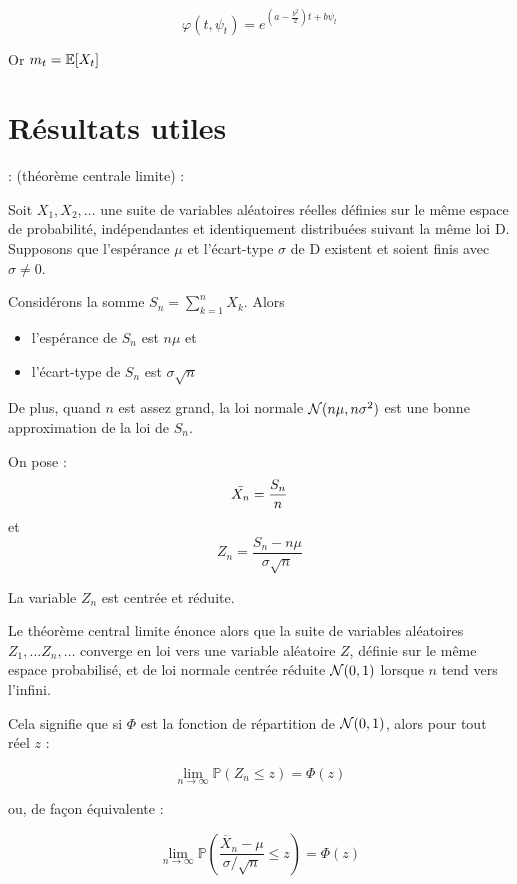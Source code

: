 \[ \varphi(t,\psi_t) = e^{(a-\frac{b^2}{2})t + b\psi_t} \]


Or $m_t = \mathbb{E}[X_t]$
\chapter{Résultats utiles}

\Th : (théorème centrale limite) : 

Soit $X_1, X_2,\ldots$ une suite de variables aléatoires réelles définies sur le même espace de probabilité, indépendantes et identiquement distribuées suivant la même loi D. Supposons que l'espérance $\mu$ et l'écart-type $\sigma$ de D existent et soient finis avec $\sigma \neq 0$.

Considérons la somme $S_n = \sum_{k=1}^n X_k$. Alors 
\begin{itemize}
  \item l'espérance de $S_n$ est $n\mu$ et
  \item l'écart-type de $S_n$ est $\sigma\sqrt{n}$
\end{itemize}

De plus, quand $n$  est \og assez grand\fg{}, la loi normale $\mathcal{N}(n\mu, n\sigma^2)$ est une bonne approximation de la loi de $S_n$.

On pose : 
\[ \Bar{X_n} = \frac{S_n}{n} \]
et 
\[ Z_n = \frac{S_n - n\mu}{\sigma\sqrt{n}} \]

La variable $Z_n$ est centrée et réduite.

Le théorème central limite énonce alors que la suite de variables aléatoires $Z_1, \ldots Z_n, \ldots$ converge en loi vers une variable aléatoire $Z$, définie sur le même espace probabilisé, et de loi normale centrée réduite $\mathcal{N}(0,1)$ lorsque $n$ tend vers l'infini.

Cela signifie que si $\Phi$ est la fonction de répartition de $\mathcal{N}(0,1)$, alors pour tout réel $z$ :

\[ \lim_{n \to \infty} \mathbb P(Z_n \le z) = \Phi(z) \]

ou, de façon équivalente :

\[ \lim_{n \to \infty}\mathbb P\left(\frac{\overline X_n - \mu}{\sigma/\sqrt n}\leq z\right) = \Phi(z)\]


